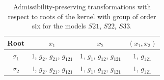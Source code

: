 \begin{table}[H]
	\caption{Admissibility-preserving transformations with respect to roots of the kernel with group of order six for the models $S21$, $S22$, $S33$.}
	\label{tbl:Admissibility62}
	\centering
	\begin{tabular}{cccc}
		\toprule
		Root & $x_1$  & $x_2$ & $(x_1,x_2)$ \\
		\midrule
		$\sigma_1$ & $1$, $ g_{2} $, $ g_{21} $, $ g_{121}$ & $1$, $ g_{1} $, $ g_{12} $, $ g_{121}$ & $1$, $ g_{121}$ \\
		$\sigma_2$ & $1$, $ g_{2} $, $ g_{21} $, $ g_{121}$ & $1$, $ g_{1} $, $ g_{12} $, $ g_{121}$ & $1$, $ g_{121}$ \\
		\bottomrule
	\end{tabular}
\end{table}


